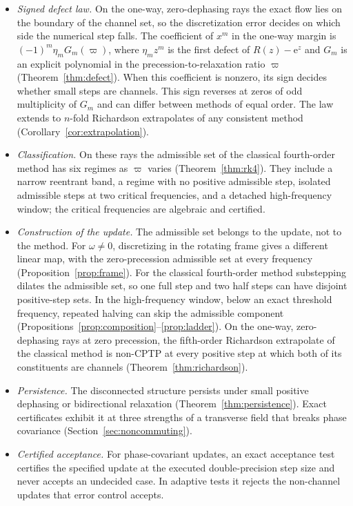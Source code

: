 \documentclass[pdflatex,sn-mathphys-num]{sn-jnl}
\newcommand{\e}{\mathrm{e}}
\theoremstyle{thmstyleone}
\theoremstyle{thmstylethree}
\theoremstyle{thmstyletwo}
\begin{document}
\begin{itemize}
\item \emph{Signed defect law.} On the one-way, zero-dephasing rays the exact flow lies on the boundary of the channel set, so the discretization error decides on which side the numerical step falls. The coefficient of $x^m$ in the one-way margin is $(-1)^m\eta_mG_m(\varpi)$, where $\eta_mz^m$ is the first defect of $R(z)-\e^z$ and $G_m$ is an explicit polynomial in the precession-to-relaxation ratio $\varpi$ (Theorem~\ref{thm:defect}). When this coefficient is nonzero, its sign decides whether small steps are channels. This sign reverses at zeros of odd multiplicity of $G_m$ and can differ between methods of equal order. The law extends to $n$-fold Richardson extrapolates of any consistent method (Corollary~\ref{cor:extrapolation}).
\item \emph{Classification.} On these rays the admissible set of the classical fourth-order method has six regimes as $\varpi$ varies (Theorem~\ref{thm:rk4}). They include a narrow reentrant band, a regime with no positive admissible step, isolated admissible steps at two critical frequencies, and a detached high-frequency window; the critical frequencies are algebraic and certified.
\item \emph{Construction of the update.} The admissible set belongs to the update, not to the method. For $\omega\ne0$, discretizing in the rotating frame gives a different linear map, with the zero-precession admissible set at every frequency (Proposition~\ref{prop:frame}). For the classical fourth-order method substepping dilates the admissible set, so one full step and two half steps can have disjoint positive-step sets. In the high-frequency window, below an exact threshold frequency, repeated halving can skip the admissible component (Propositions~\ref{prop:composition}--\ref{prop:ladder}). On the one-way, zero-dephasing rays at zero precession, the fifth-order Richardson extrapolate of the classical method is non-CPTP at every positive step at which both of its constituents are channels (Theorem~\ref{thm:richardson}).
\item \emph{Persistence.} The disconnected structure persists under small positive dephasing or bidirectional relaxation (Theorem~\ref{thm:persistence}). Exact certificates exhibit it at three strengths of a transverse field that breaks phase covariance (Section~\ref{sec:noncommuting}).
\item \emph{Certified acceptance.} For phase-covariant updates, an exact acceptance test certifies the specified update at the executed double-precision step size and never accepts an undecided case. In adaptive tests it rejects the non-channel updates that error control accepts.
\end{itemize}
\end{document}
